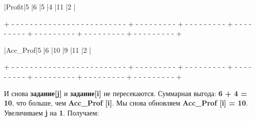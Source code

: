 \begin{tcolorbox}
\hspace{0.4mm}|\hspace{17.6mm}Profit\hspace{17.6mm}|\hspace{7.1mm}5\hspace{7.1mm} |\hspace{7.1mm}6\hspace{7.1mm} |\hspace{7.1mm}5\hspace{7.1mm} |\hspace{7.1mm}4\hspace{7.1mm} |\hspace{5.8mm}11\hspace{5.8mm} |\hspace{7.1mm}2\hspace{7.1mm} |

{\tiny{+ - - - - - - - - - - - - - - - - - - - - - - - - - + - - - - - - - - - + - - - - - - - - - + - - - - - - - - - + - - - - - - - - - + - - - - - - - - - + - - - - - - - - - +}}

\hspace{0.4mm}|\hspace{14mm}Acc\_Prof\hspace{14mm}|\hspace{7.1mm}5\hspace{7.1mm} |\hspace{7.1mm}6\hspace{7.1mm} |\hspace{6mm}10\hspace{6mm} |\hspace{7.1mm}9\hspace{7.1mm} |\hspace{5.8mm}11\hspace{5.8mm} |\hspace{7.1mm}2\hspace{7.1mm} |

{\tiny{+ - - - - - - - - - - - - - - - - - - - - - - - - - + - - - - - - - - - + - - - - - - - - - + - - - - - - - - - + - - - - - - - - - + - - - - - - - - - + - - - - - - - - - +}}
\end{tcolorbox}

\vspace{\baselineskip}
И снова \textbf{задание[j]} и \textbf{задание[i]} не пересекаются. Суммарная выгода: \textbf{6 + 4 = 10}, что больше, чем \textbf{Acc\_Prof [i]}. Мы снова обновляем \textbf{Acc\_Prof [i] = 10}. Увеличиваем \textbf{j} на \textbf{1}. Получаем: 
 
